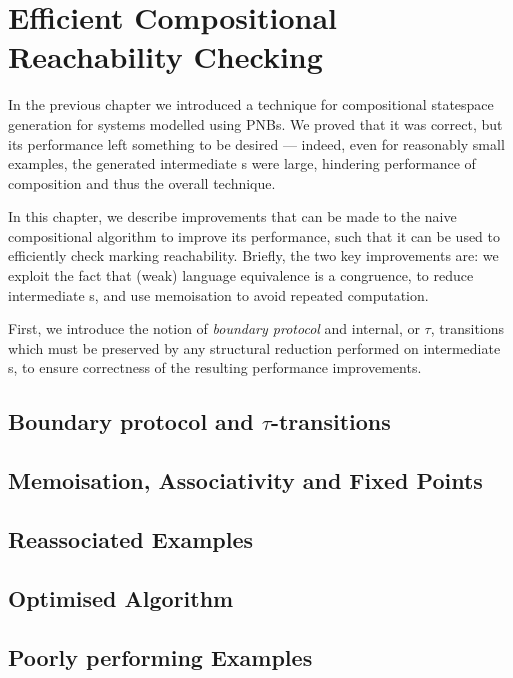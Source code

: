 \chapter{Efficient Compositional Reachability Checking}\label{chp:improveEfficiency}

In the previous chapter we introduced a technique for compositional statespace
generation for systems modelled using PNBs. We proved that it was correct, but
its performance left something to be desired --- indeed, even for reasonably
small examples, the generated intermediate \TNFA{}s were large, hindering
performance of \TNFA{} composition and thus the overall technique.

In this chapter, we describe improvements that can be made to the naive
compositional algorithm to improve its performance, such that it can be used to
efficiently check marking reachability. Briefly, the two key improvements are:
we exploit the fact that (weak) language equivalence is a congruence, to reduce
intermediate \TNFA{}s, and use memoisation to avoid repeated computation.

First, we introduce the notion of \emph{boundary protocol} and internal, or
$\tau$, transitions which must be preserved by any structural reduction
performed on intermediate \TNFA{}s, to ensure correctness of the resulting
performance improvements.

\section{Boundary protocol and $\tau$-transitions} \label{sec:boundaryProtocol}
{}

\section{Memoisation, Associativity and Fixed Points}\label{sec:memoisation}
{}

\section{Reassociated Examples}\label{sec:reassociation}
{}

\section{Optimised Algorithm}
{}

\section{Poorly performing Examples}
{}

